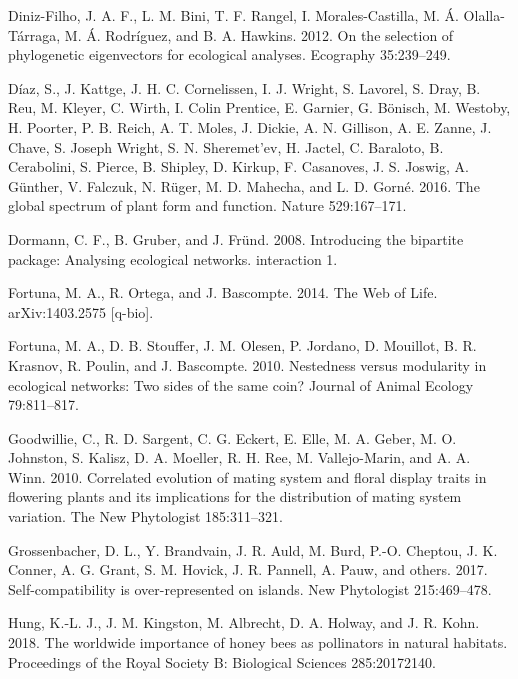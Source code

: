 \documentclass[12pt,a4paper,]{article}
\begin{document}
\hypertarget{ref-diniz-filho2012}{}
Diniz-Filho, J. A. F., L. M. Bini, T. F. Rangel, I. Morales-Castilla, M.
Á. Olalla-Tárraga, M. Á. Rodríguez, and B. A. Hawkins. 2012. On the
selection of phylogenetic eigenvectors for ecological analyses.
Ecography 35:239--249.

\hypertarget{ref-diaz2016}{}
Díaz, S., J. Kattge, J. H. C. Cornelissen, I. J. Wright, S. Lavorel, S.
Dray, B. Reu, M. Kleyer, C. Wirth, I. Colin Prentice, E. Garnier, G.
Bönisch, M. Westoby, H. Poorter, P. B. Reich, A. T. Moles, J. Dickie, A.
N. Gillison, A. E. Zanne, J. Chave, S. Joseph Wright, S. N. Sheremet'ev,
H. Jactel, C. Baraloto, B. Cerabolini, S. Pierce, B. Shipley, D. Kirkup,
F. Casanoves, J. S. Joswig, A. Günther, V. Falczuk, N. Rüger, M. D.
Mahecha, and L. D. Gorné. 2016. The global spectrum of plant form and
function. Nature 529:167--171.

\hypertarget{ref-dormann2008}{}
Dormann, C. F., B. Gruber, and J. Fründ. 2008. Introducing the bipartite
package: Analysing ecological networks. interaction 1.

\hypertarget{ref-fortuna2014}{}
Fortuna, M. A., R. Ortega, and J. Bascompte. 2014. The Web of Life.
arXiv:1403.2575 {[}q-bio{]}.

\hypertarget{ref-fortuna2010}{}
Fortuna, M. A., D. B. Stouffer, J. M. Olesen, P. Jordano, D. Mouillot,
B. R. Krasnov, R. Poulin, and J. Bascompte. 2010. Nestedness versus
modularity in ecological networks: Two sides of the same coin? Journal
of Animal Ecology 79:811--817.

\hypertarget{ref-goodwillie2010}{}
Goodwillie, C., R. D. Sargent, C. G. Eckert, E. Elle, M. A. Geber, M. O.
Johnston, S. Kalisz, D. A. Moeller, R. H. Ree, M. Vallejo-Marin, and A.
A. Winn. 2010. Correlated evolution of mating system and floral display
traits in flowering plants and its implications for the distribution of
mating system variation. The New Phytologist 185:311--321.

\hypertarget{ref-grossenbacher2017}{}
Grossenbacher, D. L., Y. Brandvain, J. R. Auld, M. Burd, P.-O. Cheptou,
J. K. Conner, A. G. Grant, S. M. Hovick, J. R. Pannell, A. Pauw, and
others. 2017. Self-compatibility is over-represented on islands. New
Phytologist 215:469--478.

\hypertarget{ref-hung2018}{}
Hung, K.-L. J., J. M. Kingston, M. Albrecht, D. A. Holway, and J. R.
Kohn. 2018. The worldwide importance of honey bees as pollinators in
natural habitats. Proceedings of the Royal Society B: Biological
Sciences 285:20172140.
\end{document}
